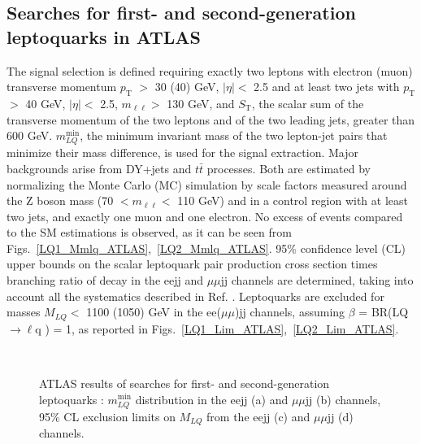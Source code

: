 \documentclass[10pt]{article}
\begin{document}
\vspace{-0.25cm}
\subsection{Searches for first- and second-generation leptoquarks in ATLAS}
\vspace{-0.15cm}
The signal selection is defined requiring exactly two leptons with electron (muon) transverse momentum $p_\mathrm{T}$ $>$ 30 (40) GeV, $|\eta| <$ 2.5 and at least two jets with $p_\mathrm{T}$ $>$ 40 GeV, $|\eta| <$ 2.5,
$m_{\ell\ell} >$ 130 GeV, and $S_\mathrm{T}$, the scalar sum of the transverse momentum of the two leptons and of the two leading jets, greater than 600 GeV.
$m^{\mathrm{min}}_{LQ}$, the minimum invariant mass of the two lepton-jet pairs that minimize their mass difference, is used for the signal extraction.
Major backgrounds arise from DY+jets and $t\bar{t}$ processes.
Both are estimated by normalizing the Monte Carlo (MC) simulation by scale factors measured around the Z boson mass (70 $< m_{\ell\ell} <$ 110 GeV)
and in a control region with at least two jets, and exactly one muon and one electron.
No excess of events compared to the SM estimations is observed, as it can be seen from Figs.~\ref{LQ1_Mmlq_ATLAS},~\ref{LQ2_Mmlq_ATLAS}. %
95\% confidence level (CL) upper bounds on the scalar leptoquark pair production cross section times branching ratio of decay in the eejj and $\mu\mu$jj channels are determined,
taking into account all the systematics described in Ref. \cite{LQ_ATLAS}. 
Leptoquarks are excluded for masses $M_{LQ} <$ 1100 (1050) GeV in the ee($\mu\mu$)jj channels, assuming $\beta$ = BR(LQ $\rightarrow \ell$q ) = 1, as reported in Figs.~\ref{LQ1_Lim_ATLAS},~\ref{LQ2_Lim_ATLAS}.
\vspace{-0.35cm}
\begin{figure}[h!]
\hspace{0.75cm}
\
\hspace{0.75cm}
\hspace{0.75cm}
\
\vspace{-0.35cm}
\caption{ATLAS results of searches for first- and second-generation leptoquarks \cite{LQ_ATLAS}: $m^{\mathrm{min}}_{LQ}$ distribution in the eejj (a) and $\mu\mu$jj (b) channels,
95\% CL exclusion limits on $M_{LQ}$ from the eejj (c) and $\mu\mu$jj (d) channels.}
\label{LQ_ATLAS}
\end{figure}
\end{document}
